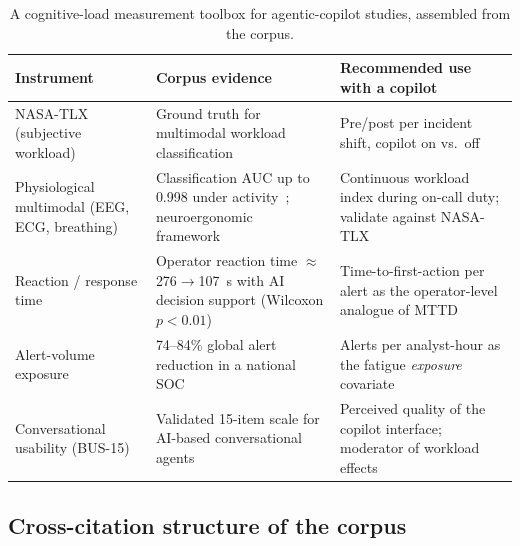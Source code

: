 \documentclass{ieeeaccess}
\begin{document}
\begin{table}[!t]
\caption{A cognitive-load measurement toolbox for agentic-copilot
studies, assembled from the corpus.}
\label{tab:cogload}
\centering
\begin{tabular}{@{}p{}p{}p{}@{}}
\toprule
\textbf{Instrument} & \textbf{Corpus evidence} & \textbf{Recommended use
with a copilot} \\
\midrule
NASA-TLX (subjective workload) & Ground truth for multimodal workload
classification~\cite{P69} & Pre/post per incident shift, copilot on vs.\
off \\
\addlinespace
Physiological multimodal (EEG, ECG, breathing) & Classification AUC up
to 0.998 under activity~\cite{P69}; neuroergonomic
framework~\cite{P62} & Continuous workload index during on-call duty;
validate against NASA-TLX \\
\addlinespace
Reaction / response time & Operator reaction time
$\approx$276$\rightarrow$107~s with AI decision support (Wilcoxon
$p<0.01$)~\cite{P81} & Time-to-first-action per alert as the
operator-level analogue of MTTD \\
\addlinespace
Alert-volume exposure & 74--84\% global alert reduction in a national
SOC~\cite{P73} & Alerts per analyst-hour as the fatigue \emph{exposure}
covariate \\
\addlinespace
Conversational usability (BUS-15) & Validated 15-item scale for AI-based
conversational agents~\cite{P63} & Perceived quality of the copilot
interface; moderator of workload effects \\
\bottomrule
\end{tabular}
\end{table}

\subsection{Cross-citation structure of the corpus}
\label{sec:cross}
\end{document}
